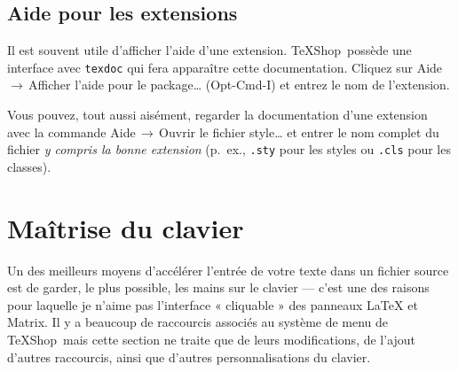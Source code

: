 \documentclass[11pt,french]{article}
\newcommand{\TS}{\textsf{\TeX Shop}}
\newcommand{\cmd}[1]{\textsf{#1}}
\newcommand{\mnu}[1]{\textsf{#1}}
\newcommand{\To}{\,\(\to\)\,}
\begin{document}

\subsection{Aide pour les extensions}

Il est souvent utile d'afficher l'aide d'une extension. \TS\ possède une interface avec \texttt{texdoc} qui fera apparaître cette documentation. Cliquez sur \mnu{Aide}\To\mnu{Afficher l'aide pour le package…} (\cmd{Opt-Cmd-I}) et entrez le nom de l'extension.

Vous pouvez, tout aussi aisément, regarder la documentation d'une extension avec la commande \mnu{Aide}\To\mnu{Ouvrir le fichier style…} et entrer le nom complet du fichier \emph{y compris la bonne extension} (p.~ex., \texttt{.sty} pour les styles ou \texttt{.cls} pour les classes).

%


\section{Maîtrise du clavier}

Un des meilleurs moyens d'accélérer l'entrée de votre texte dans un fichier source est de garder, le plus possible, les mains sur le clavier --- c'est une des raisons pour laquelle je n'aime pas l'interface « cliquable » des panneaux LaTeX et Matrix. Il y a beaucoup de raccourcis associés au système de menu de \TS\ mais cette section ne traite que de leurs modifications, de l'ajout d'autres raccourcis, ainsi que d'autres personnalisations du clavier.
\end{document}
